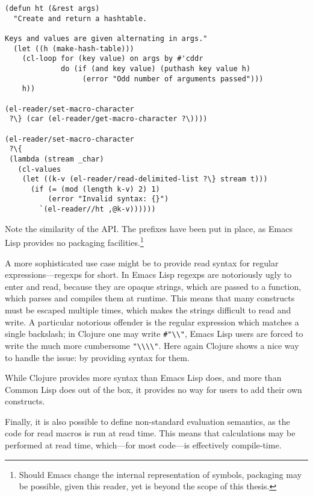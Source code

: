 \documentclass[a4paper,10pt,twoside]{report}
\newcommand{\el}{Emacs Lisp}
\newcommand{\cl}{Common Lisp}
\newcommand{\elr}{el-reader}
\begin{document}
\begin{lstlisting}[style=lispcode,caption={An equivalent read macro using
  \elr{}.}, label={code:el-hash-reader}]
(defun ht (&rest args)
  "Create and return a hashtable.

Keys and values are given alternating in args."
  (let ((h (make-hash-table)))
    (cl-loop for (key value) on args by #'cddr
             do (if (and key value) (puthash key value h)
                  (error "Odd number of arguments passed")))
    h))

(el-reader/set-macro-character
 ?\} (car (el-reader/get-macro-character ?\))))

(el-reader/set-macro-character
 ?\{
 (lambda (stream _char)
   (cl-values
    (let ((k-v (el-reader/read-delimited-list ?\} stream t)))
      (if (= (mod (length k-v) 2) 1)
          (error "Invalid syntax: {}")
        `(el-reader//ht ,@k-v))))))
\end{lstlisting}

Note the similarity of the API.  The prefixes have been put in place, as \el{}
provides no packaging facilities.\footnote{Should Emacs change the internal
  representation of symbols, packaging may be possible, given this reader, yet
  is beyond the scope of this thesis.}

A more sophisticated use case might be to provide read syntax for regular
expressions---regexps for short.  In \el{} regexps are notoriously ugly to enter
and read, because they are opaque strings, which are passed to a function, which
parses and compiles them at runtime.  This means that many constructs must be
escaped multiple times, which makes the strings difficult to read and write.  A
particular notorious offender is the regular expression which matches a single
backslash; in Clojure one may write \texttt{\#"\textbackslash\textbackslash"},
\el{} users are forced to write the much more cumbersome
\texttt{"\textbackslash\textbackslash\textbackslash\textbackslash"}.  Here again
Clojure shows a nice way to handle the issue: by providing syntax for them.

While Clojure provides more syntax than \el{} does, and more than \cl{} does out
of the box, it provides no way for users to add their own constructs.

Finally, it is also possible to define non-standard evaluation semantics, as the
code for read macros is run at read time.  This means that calculations may be
performed at read time, which---for most code---is effectively compile-time.
\end{document}
